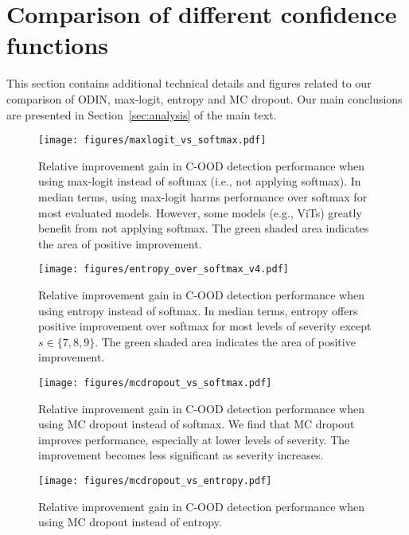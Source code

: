 \documentclass[table]{article} \usepackage{PRIMEarxiv}
\begin{document}
\section{Comparison of different confidence functions}
\label{sec:kappa_comparison}
This section contains additional technical details and figures related to our comparison of ODIN, max-logit, entropy and MC dropout. Our main conclusions are presented in Section~\ref{sec:analysis} of the main text.



\begin{figure}[h]
    \centering
    \texttt{[image: figures/maxlogit\_vs\_softmax.pdf]}
    \caption{Relative improvement gain in C-OOD detection performance when using max-logit instead of softmax (i.e., not applying softmax). In median terms, using max-logit harms performance over softmax for most evaluated models. However, some models (e.g., ViTs) greatly benefit from not applying softmax.
    The green shaded area indicates the area of positive improvement.}
    \label{fig:maxlogit_improvement_over_softmax}
\end{figure}

\begin{figure}[h]
    \centering
    \texttt{[image: figures/entropy\_over\_softmax\_v4.pdf]}
    \caption{Relative improvement gain in C-OOD detection performance when using entropy instead of softmax. In median terms, entropy offers positive improvement over softmax for most levels of severity except  $s\in\{7,8,9\}$.
    The green shaded area indicates the area of positive improvement.}
    \label{fig:entropy_improvement_over_softmax}
\end{figure}

\begin{figure}[h]
    \centering
    \texttt{[image: figures/mcdropout\_vs\_softmax.pdf]}
    \caption{Relative improvement gain in C-OOD detection performance when using MC dropout instead of softmax. We find that MC dropout improves performance, especially at lower levels of severity. The improvement becomes less significant as severity increases.}
    \label{fig:MCdropout_imrovement_over_softmax}
\end{figure}

\begin{figure}[h]
    \centering
    \texttt{[image: figures/mcdropout\_vs\_entropy.pdf]}
    \caption{Relative improvement gain in C-OOD detection performance when using  MC dropout instead of entropy. }
    \label{fig:MCdropout_imrovement_over_entropy}
\end{figure}
\end{document}
